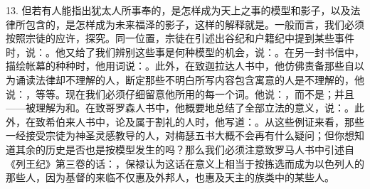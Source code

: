13. 但若有人能指出犹太人所事奉的，是怎样成为天上之事的模型和影子，以及法律所包含的，是怎样成为未来福泽的影子，这样的解释就是。一般而言，我们必须按照宗徒的应许，探究。同一位置，宗徒在引述出谷纪和户籍纪中提到某些事件时，说：。他又给了我们辨别这些事是何种模型的机会，说：。在另一封书信中，描绘帐幕的种种时，他用词说：。此外，在致迦拉达人书中，他仿佛责备那些自以为诵读法律却不理解的人，断定那些不明白所写内容包含寓意的人是不理解的，他说：，等等。现在我们必须仔细留意他所用的每一个词。他说：，而不是；并且——被理解为和。在致哥罗森人书中，他概要地总结了全部立法的意义，说：。此外，在致希伯来人书中，论及属于割礼的人时，他写道：。从这些例证来看，那些一经接受宗徒为神圣灵感教导的人，对梅瑟五书大概不会再有什么疑问；但你想知道其余的历史是否也是按模型发生的吗？那么我们必须注意致罗马人书中引述自《列王纪》第三卷的话：，保禄认为这话在意义上相当于按拣选而成为以色列人的那些人，因为基督的来临不仅惠及外邦人，也惠及天主的族类中的某些人。\par

